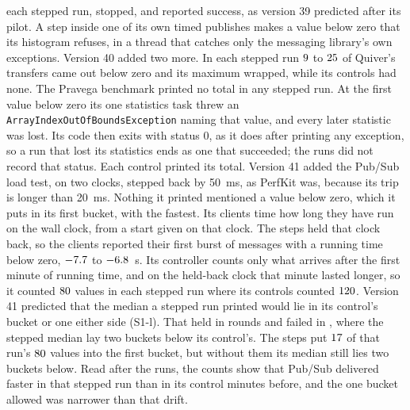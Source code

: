 \documentclass[10pt,journal,onecolumn]{IEEEtran}
\begin{document}
each stepped run, stopped, and reported success, as version 39 predicted after its pilot. A step
inside one of its own timed publishes makes a value below zero that its histogram refuses, in a thread
that catches only the messaging library's own exceptions. Version 40 added two more. In each
stepped run $9$ to $25$ of Quiver's transfers came out below zero and its
maximum wrapped, while its controls had none. The Pravega benchmark printed no total in any stepped
run. At the first value below zero its one statistics task threw an
\texttt{ArrayIndexOutOfBoundsException} naming that value, and every later statistic was lost.
Its code then exits with status 0, as it does after printing any exception, so a run that lost its
statistics ends as one that succeeded; the runs did not record that status. Each control printed
its total. Version 41 added the Pub/Sub load test, on two clocks, stepped back by 50~ms, as
PerfKit was, because its trip is longer than 20~ms. Nothing it printed mentioned a value below zero,
which it puts in its first bucket, with the fastest. Its clients time how long they have run on the
wall clock, from a start given on that clock. The steps held that clock back, so the clients
reported their first burst of messages with a running time below zero, $-7.7$ to
$-6.8$~s. Its controller counts only what arrives after the first minute of running
time, and on the held-back clock that minute lasted longer, so it counted $80$
values in each stepped run where its controls counted $120$. Version 41
predicted that the median a stepped run printed would lie in its control's bucket or one either side
(S1-l). That held in \sOnePubsubHeldWord{} rounds and failed in \sOnePubsubFailedWord{},
where the stepped median lay two buckets below its control's. The
steps put $17$ of that run's $80$ values into the first bucket,
but without them its median still lies two buckets below. Read after the runs, the counts show that
Pub/Sub delivered faster in that stepped run than in its control minutes before, and the one bucket
allowed was narrower than that drift.
\end{document}
